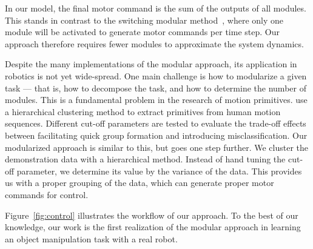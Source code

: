 In our model, the final motor command is the sum of the outputs of all
modules. This stands in contrast to the switching modular
method~\citep{narendra1997adaptive}, where only one module will be
activated to generate motor commands per time step.  Our approach therefore
requires fewer modules to approximate the system dynamics.

Despite the many implementations of the modular approach, its application
in robotics is not yet wide-spread. One main challenge is how to
modularize a given task --- that is, how to decompose the task,
and how to determine the number of modules. This is a
fundamental problem in the research of motion
primitives. \citet{kulic2008incremental} use a hierarchical clustering
method to extract primitives from human motion sequences. Different
cut-off parameters are tested to evaluate the trade-off effects
between facilitating quick group formation and introducing
misclassification. Our modularized approach is similar to this, but
goes one step further. We cluster the demonstration data with a
hierarchical method. Instead of
hand tuning the cut-off parameter, we determine its value by the
variance of the data. This provides us with a proper grouping of the
data, which can generate proper motor commands for control.

Figure~\ref{fig:control} illustrates the workflow of our approach. To
the best of our knowledge, our work is the first realization of the
modular approach in learning an object manipulation task with a real
robot.





%
%
%

